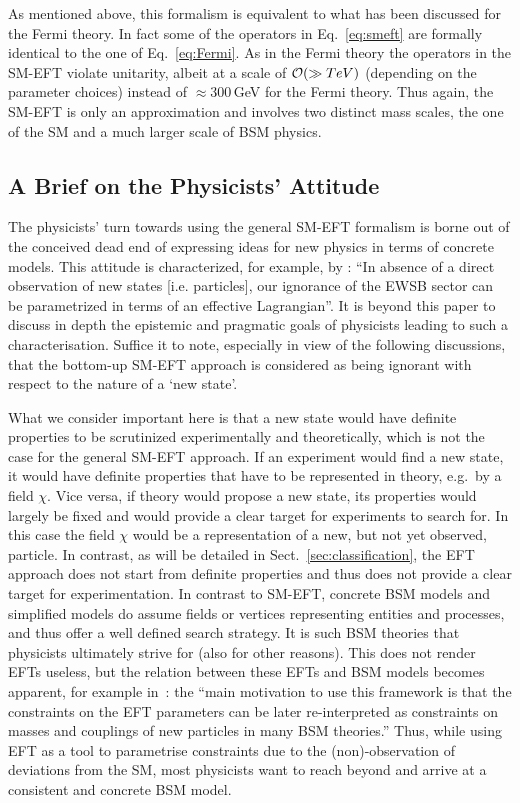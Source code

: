 As mentioned above, this formalism is equivalent to what has been discussed for the Fermi theory. 
In fact some of the operators in Eq.~\ref{eq:smeft} are formally identical to the one of Eq.~\ref{eq:Fermi}. 
As in the Fermi theory the operators in the SM-EFT violate
unitarity, albeit at a scale of ${\cal O}(\gg TeV)$ (depending on the
parameter choices) instead of $\approx
300$\,GeV for the Fermi theory. Thus again, the SM-EFT is only an approximation and
involves two distinct mass scales, the one of the SM and a much larger scale of BSM physics.


\subsection{A Brief on the Physicists' Attitude}
\label{sec:physrepres}

The physicists' turn towards using the general SM-EFT formalism is borne out of the conceived dead end of expressing ideas for new physics in terms of concrete models.
This attitude is characterized, for example, by \cite[p.~1]{Contino:2013kra}:
``In absence of a direct observation of new states [i.e.{} particles], our ignorance of the EWSB sector can be parametrized 
in terms of an effective Lagrangian''.
It is beyond this paper to discuss in depth the epistemic and pragmatic goals of physicists leading to such a characterisation.
Suffice it to note, especially in view of the following discussions, that the bottom-up SM-EFT approach is considered as being ignorant with respect to the nature of a `new state'.

What we consider important here is that a new state would have
definite properties to be scrutinized experimentally and theoretically, which is not the case for the 
general SM-EFT approach.
If an experiment would find a new state, it would have definite properties that have to be represented in theory, e.g.\ by a field $\chi $.
Vice versa, if theory would propose a new state, its properties would largely be fixed and
would provide a clear target for experiments to search for.
In this case the field $\chi $ would be a representation of a new, but
not yet observed, particle.
In contrast, as will be detailed in Sect.~\ref{sec:classification}, the EFT approach
does not start from definite properties and thus does not provide
a clear target for experimentation.  
In contrast to SM-EFT, concrete BSM models and simplified models
do assume fields or vertices representing entities and processes, and thus offer a well defined search strategy. 
It is such BSM theories that physicists ultimately strive for (also for other reasons).
This does not render EFTs useless, but the relation between these EFTs and BSM models becomes
apparent, for example in~\cite[p.~305]{deFlorian:2016spz}: the
``main motivation to use this framework is that the constraints on the EFT parameters can be 
later re-interpreted as constraints on masses and couplings of new particles in many BSM theories.''
Thus, while using EFT as a tool to parametrise constraints due to the (non)-observation of deviations
from the SM, most physicists want to reach beyond and arrive at a consistent and concrete BSM model.
